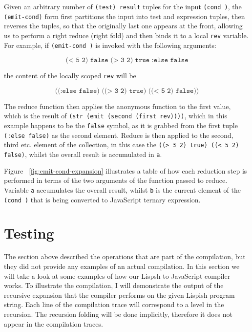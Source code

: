 

Given an arbitrary number of \texttt{(test) result} tuples for the input 
\texttt{(cond )}, the \texttt{(emit-cond)} form first partitions the input into test and expression tuples, then reverses the tuples, so that the originally last one appears at the front, allowing us to perform a right reduce (right fold) and then binds it to a local \texttt{rev} variable. 
For example, if \texttt{(emit-cond )} is invoked with the following arguments:

$$ \texttt{(< 5 2) false (> 3 2) true :else false} $$

the content of the locally scoped \texttt{rev} will be 

$$ \texttt{((:else false) ((> 3 2) true) ((< 5 2) false))} $$

The reduce function then applies the anonymous function to the first value, which is the result of \texttt{(str (emit (second (first rev))))}, which in this example happens to be the \texttt{false} symbol, as it is grabbed from the first tuple \texttt{(:else false)} as the second element. Reduce is then applied to the second, third etc. element of the collection, in this case the \texttt{((> 3 2) true) ((< 5 2) false)}, whilst the overall result is accumulated in \texttt{a}.



Figure ~\ref{fig:emit-cond-expansion} illustrates a table of how each reduction step is performed in terms of the two arguments of the function passed to reduce. Variable \texttt{a} accumulates the overall result, whilst \texttt{b} is the current element of the \texttt{(cond )} that is being converted to JavaScript ternary expression.

\section{Testing}
The section above described the operations that are part of the compilation, but they did not provide any examples of an actual compilation. 
In this section we will take a look at some examples of how our Lispsh to JavaScript compiler works. 
To illustrate the compilation, I will demonstrate the output of the recursive expansion that the compiler performs on the given Lispish program string. 
Each line of the compilation trace will correspond to a level in the recursion. The recursion folding will be done implicitly, therefore it does not appear in the compilation traces. 

